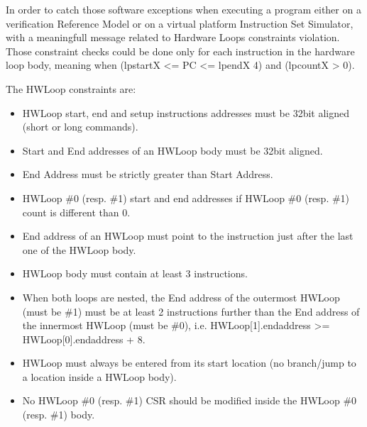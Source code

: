 \documentclass[letterpaper,10pt,english]{sphinxmanual}
\begin{document}
\sphinxAtStartPar
In order to catch  those software exceptions when executing a program either
on a verification Reference Model or on a virtual platform Instruction Set Simulator,  with a meaningfull message related to Hardware Loops constraints violation.
Those constraint checks could be done only for each instruction in the hardware loop body, meaning when (lpstartX \textless{}= PC \textless{}= lpendX \sphinxhyphen{} 4) and (lpcountX \textgreater{} 0).

\sphinxAtStartPar
The HWLoop constraints are:
\begin{itemize}
\item {} 
\sphinxAtStartPar
HWLoop start, end and setup instructions addresses must be 32\sphinxhyphen{}bit aligned (short or long commands).

\item {} 
\sphinxAtStartPar
Start and End addresses of an HWLoop body must be 32\sphinxhyphen{}bit aligned.

\item {} 
\sphinxAtStartPar
End Address must be strictly greater than Start Address.

\item {} 
\sphinxAtStartPar
HWLoop \#0 (resp. \#1) start and end addresses  if HWLoop \#0 (resp. \#1) count is different than 0.

\item {} 
\sphinxAtStartPar
End address of an HWLoop must point to the instruction just after the last one of the HWLoop body.

\item {} 
\sphinxAtStartPar
HWLoop body must contain at least 3 instructions.

\item {} 
\sphinxAtStartPar
When both loops are nested, the End address of the outermost HWLoop (must be \#1) must be at least 2
instructions further than the End address of the innermost HWLoop (must be \#0),
i.e. HWLoop{[}1{]}.endaddress \textgreater{}= HWLoop{[}0{]}.endaddress + 8.

\item {} 
\sphinxAtStartPar
HWLoop must always be entered from its start location (no branch/jump to a location inside a HWLoop body).

\item {} 
\sphinxAtStartPar
No HWLoop \#0 (resp. \#1) CSR should be modified inside the HWLoop \#0 (resp. \#1) body.


\end{itemize}
\end{document}

